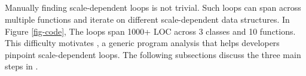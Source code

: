
\subsection{\sfind}
\label{sc-find}

Manually finding scale-dependent loops is not trivial.  Such loops can
span across multiple functions and iterate on different scale-dependent data
structures.  In Figure \ref{fig-code}, The \oonnn loops span 1000+ LOC
across 3 classes and 10 functions.
%
This difficulty motivates \sfind, a generic program analysis that helps
developers pinpoint scale-dependent loops.  The following subsections
discuss the three main steps in \sfind.






